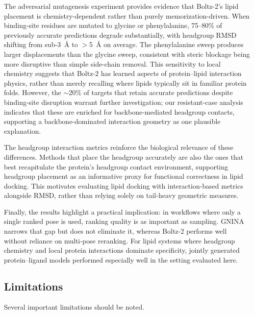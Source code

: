 \documentclass[journal=jcisd8,manuscript=article]{achemso}
\begin{document}
The adversarial mutagenesis experiment provides evidence that Boltz-2's lipid placement is chemistry-dependent rather than purely memorization-driven.
When binding-site residues are mutated to glycine or phenylalanine, 75--80\% of previously accurate predictions degrade substantially, with headgroup RMSD shifting from sub-\SI{3}{\angstrom} to $>$\SI{5}{\angstrom} on average.
The phenylalanine sweep produces larger displacements than the glycine sweep, consistent with steric blockage being more disruptive than simple side-chain removal.
This sensitivity to local chemistry suggests that Boltz-2 has learned aspects of protein--lipid interaction physics, rather than merely recalling where lipids typically sit in familiar protein folds.
However, the $\sim$20\% of targets that retain accurate predictions despite binding-site disruption warrant further investigation; our resistant-case analysis indicates that these are enriched for backbone-mediated headgroup contacts, supporting a backbone-dominated interaction geometry as one plausible explanation.

The headgroup interaction metrics reinforce the biological relevance of these differences.
Methods that place the headgroup accurately are also the ones that best recapitulate the protein's headgroup contact environment, supporting headgroup placement as an informative proxy for functional correctness in lipid docking.
This motivates evaluating lipid docking with interaction-based metrics alongside RMSD, rather than relying solely on tail-heavy geometric measures.

Finally, the results highlight a practical implication: in workflows where only a single ranked pose is used, ranking quality is as important as sampling.
GNINA narrows that gap but does not eliminate it, whereas Boltz-2 performs well without reliance on multi-pose reranking.
For lipid systems where headgroup chemistry and local protein interactions dominate specificity, jointly generated protein--ligand models performed especially well in the setting evaluated here.

\subsection{Limitations}

Several important limitations should be noted.
\end{document}
